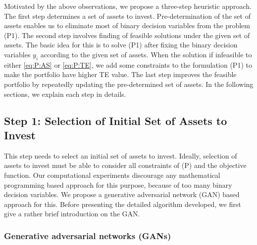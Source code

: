 \documentclass[11pt]{article}
\begin{document}
Motivated by the above observations, we propose a three-step heuristic approach. The first step determines a set of assets to invest. Pre-determination of the set of assets enables us to eliminate most of binary decision variables from the problem (P1). The second step involves finding of feasible solutions under the given set of assets. The basic idea for this is to solve (P1) after fixing the binary decision variables $y_i$ according to the given set of assets. When the solution if infeasible to either \eqref{eq:P:AS} or \eqref{eq:P:TE}, we add some constraints to the formulation (P1) to make the portfolio have higher TE value. The last step improves the feasible portfolio by repeatedly updating the pre-determined set of assets. In the following sections, we explain each step in details.

\subsection{Step 1: Selection of Initial Set of Assets to Invest}

This step needs to select an initial set of assets to invest. Ideally, selection of assets to invest must be able to consider all constraints of (P) and the objective function. Our computational experiments discourage any mathematical programming based approach for this purpose, because of too many binary decision variables. We propose a generative adversarial network (GAN) based approach for this. Before presenting the detailed algorithm developed, we first give a rather brief introduction on the GAN.


\subsubsection{Generative adversarial networks (GANs)}
\end{document}
